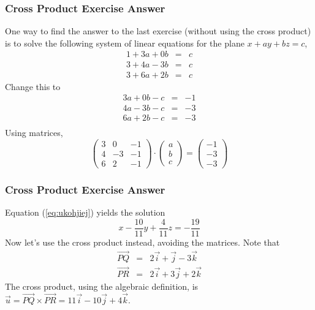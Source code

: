 \documentclass[xcolor=dvipsnames]{beamer}
\newcounter{exercise}
\begin{document}
\begin{frame}
  \frametitle{Cross Product Exercise Answer}
One way to find the answer to the last exercise (without using the
cross product) is to solve the following system of linear equations
for the plane $x+ay+bz=c$,
\begin{equation}
  \label{eq:yohghaef}
  \begin{array}{rcl}
    1+3a+0b&=&c \\
    3+4a-3b&=&c \\
    3+6a+2b&=&c
  \end{array}
\end{equation}
Change this to
\begin{equation}
  \label{eq:oxeingiu}
  \begin{array}{rcl}
    3a+0b-c&=&-1 \\
    4a-3b-c&=&-3 \\
    6a+2b-c&=&-3 \\
  \end{array}
\end{equation}
Using matrices,
\begin{equation}
  \label{eq:ukohjiej}
  \left(
    \begin{array}{ccc}
      3&0&-1 \\
      4&-3&-1 \\
      6&2&-1
    \end{array}\right)\cdot\left(
    \begin{array}{c}
      a \\
      b \\
      c
    \end{array}\right)=\left(
    \begin{array}{c}
      -1 \\
      -3 \\
      -3
    \end{array}\right)
\end{equation}
\end{frame}

\begin{frame}
  \frametitle{Cross Product Exercise Answer}
  Equation (\ref{eq:ukohjiej}) yields the solution
  \begin{equation}
    \label{eq:maeshael}
      x-\frac{10}{11}y+\frac{4}{11}z=-\frac{19}{11}
  \end{equation}
Now let's use the cross product instead, avoiding the matrices. Note
that
\begin{equation}
  \label{eq:ushahroh}
  \begin{array}{rcl}
    \vec{PQ}&=&2\vec{i}+\vec{j}-3\vec{k} \\
    \vec{PR}&=&2\vec{i}+3\vec{j}+2\vec{k}
  \end{array}
\end{equation}
The cross product, using the algebraic definition, is
$\vec{u}=\vec{PQ}\times\vec{PR}=11\vec{i}-10\vec{j}+4\vec{k}$.
\end{frame}
\end{document}

